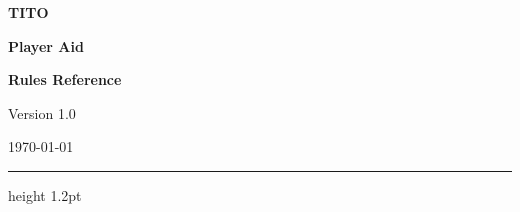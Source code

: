 \documentclass[10pt,letterpaper]{article}
\begin{document}
\thispagestyle{fancy}

\noindent
\begin{minipage}[t]{0.57\textwidth}
  {\sffamily\bfseries\fontsize{32}{32}\selectfont\color{TitoInk}TITO\par}
  \vspace{1pt}
  {\sffamily\bfseries\fontsize{17}{19}\selectfont\color{TitoRule}
    Player Aid\par}
\end{minipage}
\hfill
\begin{minipage}[t]{0.39\textwidth}
  \raggedleft\vspace{1pt}
  {\sffamily\bfseries Rules Reference\par}
  {\sffamily\small Version 1.0\par}
  {\sffamily\small \today\par}
\end{minipage}

\vspace{3pt}
{\color{TitoInk}\hrule height 1.2pt}
\vspace{3pt}
\end{document}

